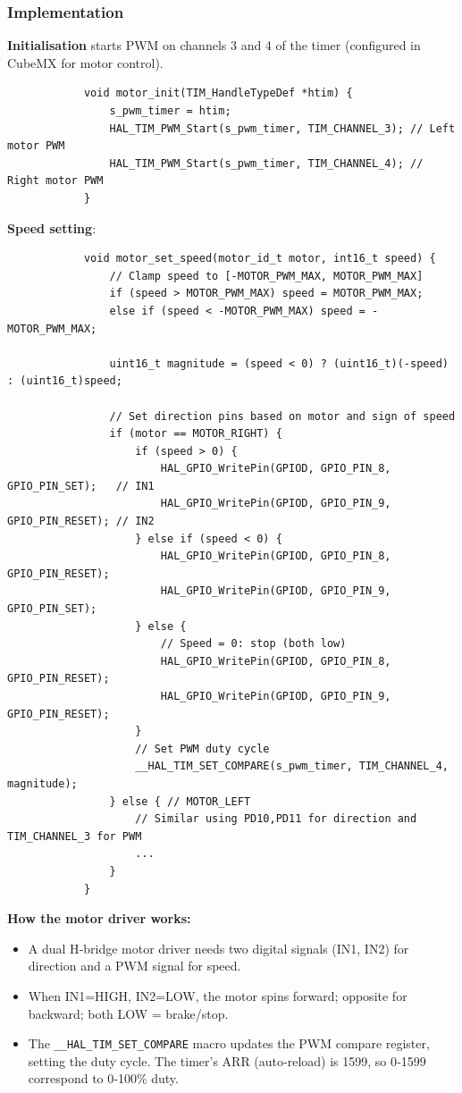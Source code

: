\documentclass[12pt,a4paper]{article}
\begin{document}
		\subsubsection{Implementation}
		\textbf{Initialisation} starts PWM on channels 3 and 4 of the timer (configured in CubeMX for motor control).
		\begin{lstlisting}
			void motor_init(TIM_HandleTypeDef *htim) {
				s_pwm_timer = htim;
				HAL_TIM_PWM_Start(s_pwm_timer, TIM_CHANNEL_3); // Left motor PWM
				HAL_TIM_PWM_Start(s_pwm_timer, TIM_CHANNEL_4); // Right motor PWM
			}
		\end{lstlisting}
		
		\textbf{Speed setting}:
		\begin{lstlisting}
			void motor_set_speed(motor_id_t motor, int16_t speed) {
				// Clamp speed to [-MOTOR_PWM_MAX, MOTOR_PWM_MAX]
				if (speed > MOTOR_PWM_MAX) speed = MOTOR_PWM_MAX;
				else if (speed < -MOTOR_PWM_MAX) speed = -MOTOR_PWM_MAX;
				
				uint16_t magnitude = (speed < 0) ? (uint16_t)(-speed) : (uint16_t)speed;
				
				// Set direction pins based on motor and sign of speed
				if (motor == MOTOR_RIGHT) {
					if (speed > 0) {
						HAL_GPIO_WritePin(GPIOD, GPIO_PIN_8, GPIO_PIN_SET);   // IN1
						HAL_GPIO_WritePin(GPIOD, GPIO_PIN_9, GPIO_PIN_RESET); // IN2
					} else if (speed < 0) {
						HAL_GPIO_WritePin(GPIOD, GPIO_PIN_8, GPIO_PIN_RESET);
						HAL_GPIO_WritePin(GPIOD, GPIO_PIN_9, GPIO_PIN_SET);
					} else {
						// Speed = 0: stop (both low)
						HAL_GPIO_WritePin(GPIOD, GPIO_PIN_8, GPIO_PIN_RESET);
						HAL_GPIO_WritePin(GPIOD, GPIO_PIN_9, GPIO_PIN_RESET);
					}
					// Set PWM duty cycle
					__HAL_TIM_SET_COMPARE(s_pwm_timer, TIM_CHANNEL_4, magnitude);
				} else { // MOTOR_LEFT
					// Similar using PD10,PD11 for direction and TIM_CHANNEL_3 for PWM
					...
				}
			}
		\end{lstlisting}
		\textbf{How the motor driver works:}
		\begin{itemize}
			\item A dual H‑bridge motor driver needs two digital signals (IN1, IN2) for direction and a PWM signal for speed.
			\item When IN1=HIGH, IN2=LOW, the motor spins forward; opposite for backward; both LOW = brake/stop.
			\item The \texttt{\_\_HAL\_TIM\_SET\_COMPARE} macro updates the PWM compare register, setting the duty cycle. The timer’s ARR (auto‑reload) is 1599, so 0‑1599 correspond to 0‑100\% duty.
		\end{itemize}
		
\end{document}
